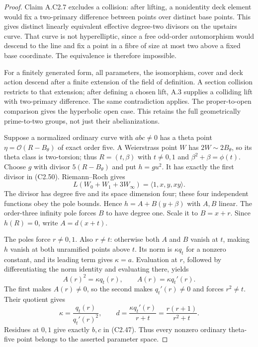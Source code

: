 \begin{proof}
Claim A.C2.7 excludes a collision: after lifting,
a nonidentity deck element would fix a two-primary
difference between points over distinct base points.
This gives distinct linearly equivalent effective
degree-two divisors on the upstairs curve.
That curve is not hyperelliptic, since a free
odd-order automorphism would descend to the line
and fix a point in a fibre of size at most two
above a fixed base coordinate. The equivalence
is therefore impossible.

For a finitely generated form, all parameters,
the isomorphism, cover and deck action descend
after a finite extension of the field of definition.
A section collision restricts to that extension;
after defining a chosen lift, A.3 supplies a
colliding lift with two-primary difference.
The same contradiction applies. The proper-to-open
comparison gives the hyperbolic open case.
This retains the full geometrically prime-to-two
groups, not just their abelianizations.

Suppose a normalized ordinary curve with $abc\ne0$
has a theta point $\eta=\mathcal O(R-B_\theta)$
of exact order five. A Weierstrass point $W$ has
$2W\sim2B_\theta$, so its theta class is two-torsion;
thus $R=(t,\beta)$ with $t\ne0,1$ and
$\beta^2+\beta=\phi(t)$.
Choose $g$ with divisor $5(R-B_\theta)$ and
put $h=gu^2$. It has exactly the first divisor
in (C2.50). Riemann--Roch gives
\[
             L(W_0+W_1+3W_\infty)=\langle1,x,y,xy\rangle.
\]
The divisor has degree five and its space dimension
four; these four independent functions obey the
pole bounds. Hence $h=A+B(y+\beta)$ with $A,B$
linear. The order-three infinity pole forces
$B$ to have degree one. Scale it to $B=x+r$.
Since $h(R)=0$, write $A=d(x+t)$.

The poles force $r\ne0,1$. Also $r\ne t$:
otherwise both $A$ and $B$ vanish at $t$, making
$h$ vanish at both unramified points above $t$.
Its norm is $\kappa q_t$ for a nonzero constant,
and its leading term gives $\kappa=a$.
Evaluation at $r$, followed by differentiating
the norm identity and evaluating there, yields
\[
                    A(r)^2=\kappa q_t(r),\qquad
                    A(r)=\kappa q_t'(r).                       \tag{C2.51}
\]
The first makes $A(r)\ne0$, so the second makes
$q_t'(r)\ne0$ and forces $r^2\ne t$.
Their quotient gives
\[
       \kappa=\frac{q_t(r)}{q_t'(r)^2},\qquad
       d=\frac{\kappa q_t'(r)}{r+t}
                        =\frac{r(r+1)}{r^2+t}.
\]
Residues at $0,1$ give exactly $b,c$ in (C2.47).
Thus every nonzero ordinary theta-five point
belongs to the asserted parameter space.


\end{proof}

